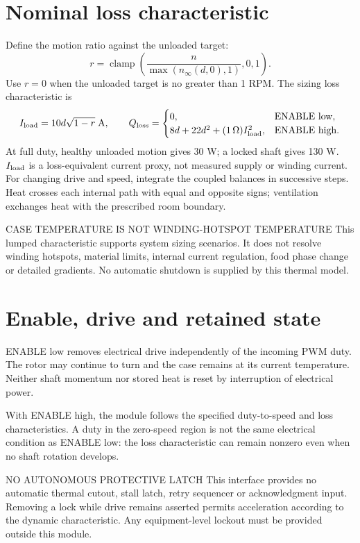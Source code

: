 \documentclass[10pt]{article}
\begin{document}
\section*{Nominal loss characteristic}
Define the motion ratio against the unloaded target:
\[
 r=\operatorname{clamp}\!\left(\frac{n}{\max(n_{\infty}(d,0),1)},0,1\right).
\]
Use $r=0$ when the unloaded target is no greater than 1 RPM. The sizing loss characteristic is
\[
 I_{\rm load}=10d\sqrt{1-r}\;\mathrm{A},\qquad
 Q_{\mathrm{loss}}=\begin{cases}
 0,&\text{ENABLE low},\\
 8d+22d^2+(1\,\Omega)I_{\rm load}^{2},&\text{ENABLE high}.
 \end{cases}
\]
At full duty, healthy unloaded motion gives 30 W; a locked shaft gives 130 W. $I_{\rm load}$ is a loss-equivalent current proxy, not measured supply or winding current. For changing drive and speed, integrate the coupled balances in successive steps. Heat crosses each internal path with equal and opposite signs; ventilation exchanges heat with the prescribed room boundary.
\vfill\begin{Notice}{CASE TEMPERATURE IS NOT WINDING-HOTSPOT TEMPERATURE}
This lumped characteristic supports system sizing scenarios. It does not resolve winding hotspots, material limits, internal current regulation, food phase change or detailed gradients. No automatic shutdown is supplied by this thermal model.
\end{Notice}
\clearpage
{}
\section*{Enable, drive and retained state}
ENABLE low removes electrical drive independently of the incoming PWM duty. The rotor may continue to turn and the case remains at its current temperature. Neither shaft momentum nor stored heat is reset by interruption of electrical power.

With ENABLE high, the module follows the specified duty-to-speed and loss characteristics. A duty in the zero-speed region is not the same electrical condition as ENABLE low: the loss characteristic can remain nonzero even when no shaft rotation develops.
\begin{Notice}{NO AUTONOMOUS PROTECTIVE LATCH}
This interface provides no automatic thermal cutout, stall latch, retry sequencer or acknowledgment input. Removing a lock while drive remains asserted permits acceleration according to the dynamic characteristic. Any equipment-level lockout must be provided outside this module.
\end{Notice}
\end{document}
